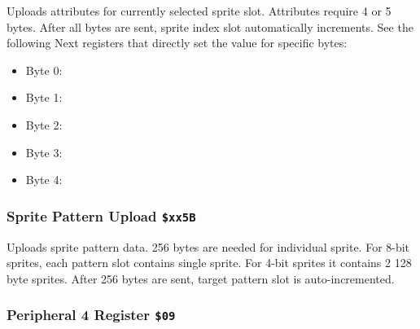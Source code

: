 \documentclass[12pt,twoside,openright,a4paper]{book}
\begin{document}
Uploads attributes for currently selected sprite slot. Attributes require 4 or 5 bytes. After all bytes are sent, sprite index slot automatically increments. See the following Next registers that directly set the value for specific bytes:

\begin{itemize}[topsep=1pt,itemsep=1pt]
	\item Byte 0: 
	\item Byte 1: 
	\item Byte 2: 
	\item Byte 3: 
	\item Byte 4: 
\end{itemize}


\subsubsection{Sprite Pattern Upload {\tt \$xx5B}}

Uploads sprite pattern data. 256 bytes are needed for individual sprite. For 8-bit sprites, each pattern slot contains single sprite. For 4-bit sprites it contains 2 128 byte sprites. After 256 bytes are sent, target pattern slot is auto-incremented.

\begin{NextPort}
\end{NextPort}


\subsubsection{Peripheral 4 Register {\tt \$09}}
\end{document}
